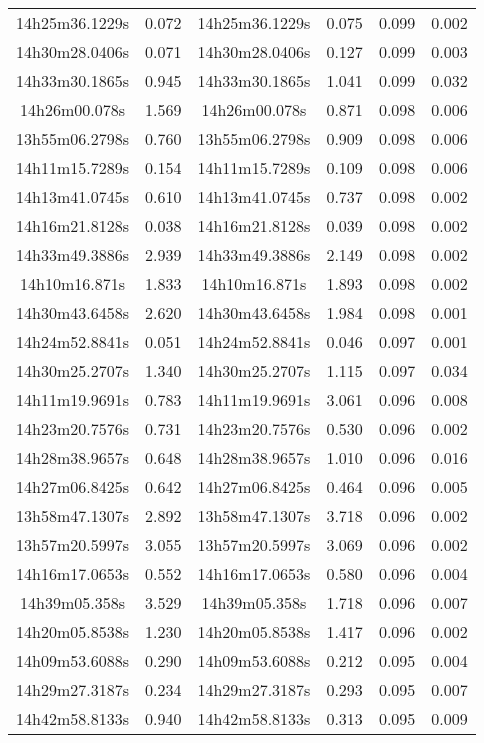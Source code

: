 \begin{table}
\begin{tabular}{cccccc}
14h25m36.1229s & 0.072 & 14h25m36.1229s & 0.075 & 0.099 & 0.002 \\
14h30m28.0406s & 0.071 & 14h30m28.0406s & 0.127 & 0.099 & 0.003 \\
14h33m30.1865s & 0.945 & 14h33m30.1865s & 1.041 & 0.099 & 0.032 \\
14h26m00.078s & 1.569 & 14h26m00.078s & 0.871 & 0.098 & 0.006 \\
13h55m06.2798s & 0.760 & 13h55m06.2798s & 0.909 & 0.098 & 0.006 \\
14h11m15.7289s & 0.154 & 14h11m15.7289s & 0.109 & 0.098 & 0.006 \\
14h13m41.0745s & 0.610 & 14h13m41.0745s & 0.737 & 0.098 & 0.002 \\
14h16m21.8128s & 0.038 & 14h16m21.8128s & 0.039 & 0.098 & 0.002 \\
14h33m49.3886s & 2.939 & 14h33m49.3886s & 2.149 & 0.098 & 0.002 \\
14h10m16.871s & 1.833 & 14h10m16.871s & 1.893 & 0.098 & 0.002 \\
14h30m43.6458s & 2.620 & 14h30m43.6458s & 1.984 & 0.098 & 0.001 \\
14h24m52.8841s & 0.051 & 14h24m52.8841s & 0.046 & 0.097 & 0.001 \\
14h30m25.2707s & 1.340 & 14h30m25.2707s & 1.115 & 0.097 & 0.034 \\
14h11m19.9691s & 0.783 & 14h11m19.9691s & 3.061 & 0.096 & 0.008 \\
14h23m20.7576s & 0.731 & 14h23m20.7576s & 0.530 & 0.096 & 0.002 \\
14h28m38.9657s & 0.648 & 14h28m38.9657s & 1.010 & 0.096 & 0.016 \\
14h27m06.8425s & 0.642 & 14h27m06.8425s & 0.464 & 0.096 & 0.005 \\
13h58m47.1307s & 2.892 & 13h58m47.1307s & 3.718 & 0.096 & 0.002 \\
13h57m20.5997s & 3.055 & 13h57m20.5997s & 3.069 & 0.096 & 0.002 \\
14h16m17.0653s & 0.552 & 14h16m17.0653s & 0.580 & 0.096 & 0.004 \\
14h39m05.358s & 3.529 & 14h39m05.358s & 1.718 & 0.096 & 0.007 \\
14h20m05.8538s & 1.230 & 14h20m05.8538s & 1.417 & 0.096 & 0.002 \\
14h09m53.6088s & 0.290 & 14h09m53.6088s & 0.212 & 0.095 & 0.004 \\
14h29m27.3187s & 0.234 & 14h29m27.3187s & 0.293 & 0.095 & 0.007 \\
14h42m58.8133s & 0.940 & 14h42m58.8133s & 0.313 & 0.095 & 0.009 \\

\end{tabular}
\end{table}
